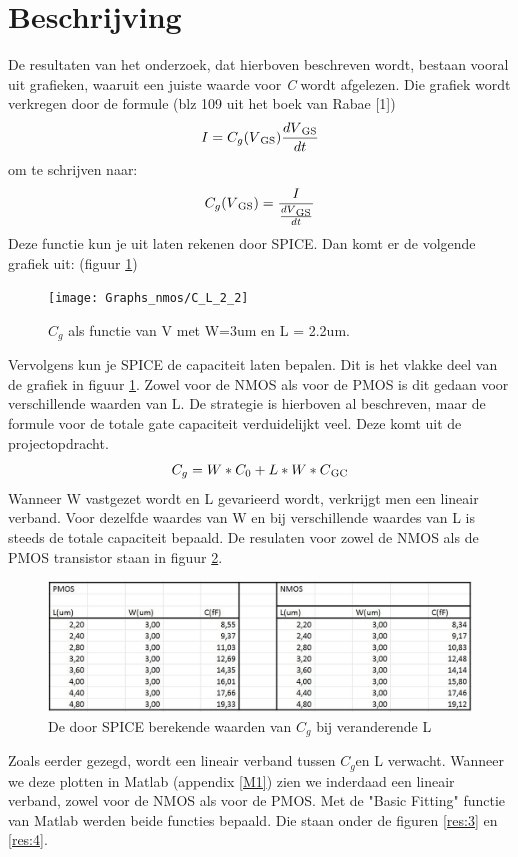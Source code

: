 
 \section{Beschrijving}
 De resultaten van het onderzoek, dat hierboven beschreven wordt, bestaan vooral uit grafieken, waaruit een juiste waarde voor \textit{C} wordt afgelezen. Die grafiek wordt verkregen door de formule (blz 109 uit het boek van Rabae [1])
 \begin{equation}
 I = C_g(V\textsubscript{GS}) \frac{dV\textsubscript{GS}}{dt}
 \end{equation}
 om te schrijven naar:
 \begin{equation}
 C_g(V\textsubscript{GS})= \frac{I}{ \frac{dV\textsubscript{GS}}{dt}}
 \end{equation}
 Deze functie kun je uit laten rekenen door SPICE. Dan komt er de volgende grafiek uit: (figuur \ref{res:1}) 
 \begin{figure} [h!]
 \texttt{[image: Graphs\_nmos/C\_L\_2\_2]}
 \caption{$C_g$ als functie van V met W=3um en L = 2.2um.}
 \label{res:1}
 \end{figure}
 Vervolgens kun je SPICE de capaciteit laten bepalen. Dit is het vlakke deel van de grafiek in figuur \ref{res:1}. Zowel voor  de NMOS als voor de PMOS is dit gedaan voor verschillende waarden van L. De strategie is hierboven al beschreven, maar de formule voor de totale gate capaciteit verduidelijkt veel. Deze komt uit de projectopdracht. 
 \begin{equation} \label{res:eq1}
 C_g = W *C_0 + L *W *C\textsubscript{GC}
 \end{equation}
 Wanneer W vastgezet wordt en L gevarieerd wordt, verkrijgt men een lineair verband. Voor dezelfde waardes van W en bij verschillende waardes van L is steeds de totale capaciteit bepaald. De resulaten voor zowel de NMOS als de PMOS transistor staan in figuur \ref{res:2}.
 \begin{figure} [h!]
 \includegraphics [scale = 0.4] {figures/tabel}
 \caption{De door SPICE berekende waarden van $C_g$ bij veranderende L}
 \label{res:2}
 \end{figure}
 Zoals eerder gezegd, wordt een lineair verband tussen \textit{$C_g$}en L verwacht. Wanneer we deze plotten in Matlab (appendix  \ref{M1}) zien we inderdaad een lineair verband, zowel voor de NMOS als voor de PMOS. Met de "Basic Fitting" functie van Matlab werden beide functies bepaald. Die staan onder de figuren \ref{res:3} en \ref{res:4}.
 
